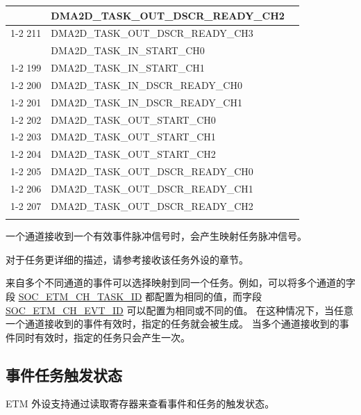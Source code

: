 \documentclass[main\_\_CN.tex]{subfiles}
\begin{document}
\begin{longtable}{ | l | l | l | }
{210 & DMA2D\_TASK\_OUT\_DSCR\_READY\_CH2  & \\ \cline{1-2}
211 & DMA2D\_TASK\_OUT\_DSCR\_READY\_CH3  & \\ \hline
}{%
198 & DMA2D\_TASK\_IN\_START\_CH0  & \nameref{mod:2ddma} \\ \cline{1-2}
199 & DMA2D\_TASK\_IN\_START\_CH1  & \\ \cline{1-2}
200 & DMA2D\_TASK\_IN\_DSCR\_READY\_CH0  & \\ \cline{1-2}
201 & DMA2D\_TASK\_IN\_DSCR\_READY\_CH1  & \\ \cline{1-2}
202 & DMA2D\_TASK\_OUT\_START\_CH0  & \\ \cline{1-2}
203 & DMA2D\_TASK\_OUT\_START\_CH1  & \\ \cline{1-2}
204 & DMA2D\_TASK\_OUT\_START\_CH2  & \\ \cline{1-2}
205 & DMA2D\_TASK\_OUT\_DSCR\_READY\_CH0  & \\ \cline{1-2}
206 & DMA2D\_TASK\_OUT\_DSCR\_READY\_CH1  & \\ \cline{1-2}
207 & DMA2D\_TASK\_OUT\_DSCR\_READY\_CH2  & \\ \hline
}
\end{longtable}

一个通道接收到一个有效事件脉冲信号时，会产生映射任务脉冲信号。

对于任务更详细的描述，请参考接收该任务外设的章节。

来自多个不同通道的事件可以选择映射到同一个任务。例如，可以将多个通道的字段 \hyperref[fielddesc:SOCETMCH0TASKID]{SOC\_ETM\_CH\_TASK\_ID} 都配置为相同的值，而字段 \hyperref[fielddesc:SOCETMCH0EVTID]{SOC\_ETM\_CH\_EVT\_ID} 可以配置为相同或不同的值。 在这种情况下，当任意一个通道接收到的事件有效时，指定的任务就会被生成。 当多个通道接收到的事件同时有效时，指定的任务只会产生一次。

\subsection{事件任务触发状态}

ETM 外设支持通过读取寄存器来查看事件和任务的触发状态。
\end{document}
